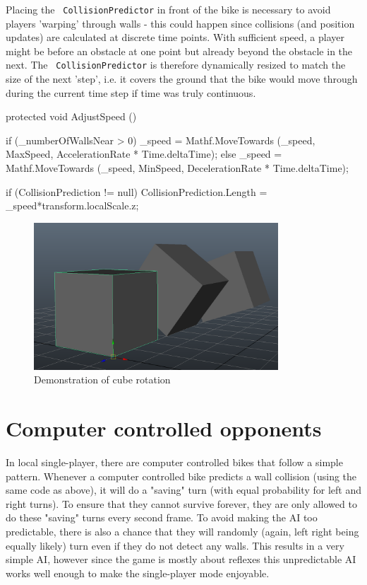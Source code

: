 \documentclass{report}
\newcommand{\cs}[1]{\texttt{\penalty 100 #1}}
\begin{document}
Placing the \cs{CollisionPredictor} in front of the bike is necessary to avoid players 'warping' through walls  - this could happen since collisions (and position updates) are calculated at discrete time points. With sufficient speed, a player might be before an obstacle at one point but already beyond the obstacle in the next.
The \cs{CollisionPredictor} is therefore dynamically resized to match the size of the next 'step', i.e. it covers the ground that the bike would move through during the current time step if time was truly continuous. 

\begin{CS}
protected void AdjustSpeed () {
		if (_numberOfWallsNear > 0) {
			_speed = Mathf.MoveTowards (_speed, MaxSpeed, AccelerationRate * Time.deltaTime);
		} else {
			_speed = Mathf.MoveTowards (_speed, MinSpeed, DecelerationRate * Time.deltaTime);
		}
		
		if (CollisionPrediction != null)
			CollisionPrediction.Length = _speed*transform.localScale.z;
	}
	\end{CS}

 \begin{figure}
 	 	    \includegraphics[height=5.5cm]{cube_rotation_illustration.png}
 	  
 	 	\caption{Demonstration of cube rotation}
 \end{figure}

 
\section{Computer controlled opponents}
In local single-player, there are computer controlled bikes that follow a simple pattern. 
Whenever a computer controlled bike predicts a wall collision (using the same code as above), it will do a "saving" turn (with equal probability for left and right turns). To ensure that they cannot survive forever, they are only allowed to do these "saving" turns every second frame.
To avoid making the AI too predictable, there is also a chance that they will randomly (again, left right being equally likely) turn even if they do not detect any walls.
This results in a very simple AI, however since the game is mostly about reflexes this unpredictable AI works well enough to make the single-player mode enjoyable.
\end{document}
